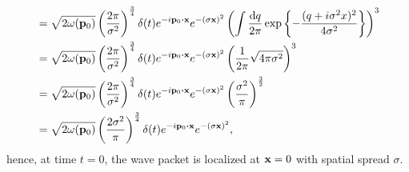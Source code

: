 \begin{example}
\begin{equation*}
\begin{split}
			&=
			\sqrt{2\omega(\vb{p}_0)}
			\left(\frac{2\pi}{\sigma^2}\right)^{\frac{3}{4}}
			\delta(t)
			e^{-i\vb{p}_0\vdot\vb{x}}
			e^{-(\sigma\vb{x})^2}
			\left(
				\int\frac{\dd{q}}{2\pi}
				\exp\left\{
					-
					\frac{(q+i\sigma^2x)^2}{4\sigma^2}
				\right\}
			\right)^3
			\\
			&=
			\sqrt{2\omega(\vb{p}_0)}
			\left(\frac{2\pi}{\sigma^2}\right)^{\frac{3}{4}}
			\delta(t)
			e^{-i\vb{p}_0\vdot\vb{x}}
			e^{-(\sigma\vb{x})^2}
			\left(
				\frac{1}{2\pi}
				\sqrt{4\pi\sigma^2}
			\right)^3
			\\
			&=
			\sqrt{2\omega(\vb{p}_0)}
			\left(\frac{2\pi}{\sigma^2}\right)^{\frac{3}{4}}
			\delta(t)
			e^{-i\vb{p}_0\vdot\vb{x}}
			e^{-(\sigma\vb{x})^2}
			\left(
				\frac{\sigma^2}{\pi}
			\right)^\frac{3}{2}
			\\
			&=
			\sqrt{2\omega(\vb{p}_0)}
			\left(\frac{2\sigma^2}{\pi}\right)^{\frac{3}{4}}
			\delta(t)
			e^{-i\vb{p}_0\vdot\vb{x}}
			e^{-(\sigma\vb{x})^2}
			,
		\end{split}
	\end{equation*}
	hence, at time $t=0$, the wave packet is localized at $\vb{x}=0$ with spatial spread $\sigma$.


\end{example}
